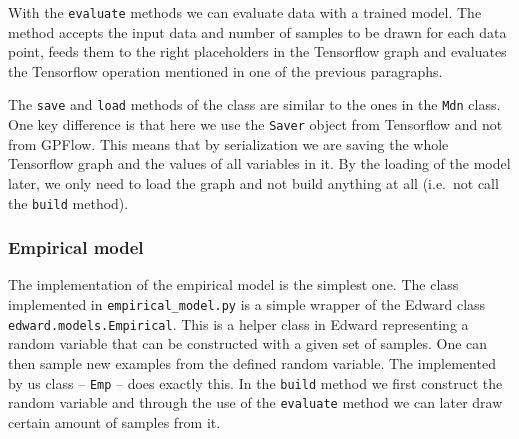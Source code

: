 \documentclass[12pt,a4paper,twoside]{scrartcl}
\numberwithin{equation}{section}
\begin{document}
With the \texttt{evaluate} methods we can evaluate data with a trained model. The method accepts the input data and number of samples to be drawn for each data point, feeds them to the right placeholders in the Tensorflow graph and evaluates the Tensorflow operation mentioned in one of the previous paragraphs.

The \texttt{save} and \texttt{load} methods of the class are similar to the ones in the \texttt{Mdn} class. One key difference is that here we use the \texttt{Saver} object from Tensorflow and not from GPFlow. This means that by serialization we are saving the whole Tensorflow graph and the values of all variables in it. By the loading of the model later, we only need to load the graph and not build anything at all (i.e.\ not call the \texttt{build} method).
\subsubsection{Empirical model}\label{sec:emp-impl}
The implementation of the empirical model is the simplest one. The class implemented in \texttt{empirical\_model.py} is a simple wrapper of the Edward class \texttt{edward.models.Empirical}. This is a helper class in Edward representing a random variable that can be constructed with a given set of samples. One can then sample new examples from the defined random variable. The implemented by us class -- \texttt{Emp} -- does exactly this. In the \texttt{build} method we first construct the random variable and through the use of the \texttt{evaluate} method we can later draw certain amount of samples from it.
\end{document}
